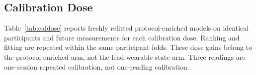 \documentclass[12pt]{article}
\begin{document}
\subsection{Calibration Dose}
\label{sec:caldose}
Table~\ref{tab:caldose} reports freshly refitted protocol-enriched models on identical participants and future measurements for each calibration dose. Ranking and fitting are repeated within the same participant folds. These dose gains belong to the protocol-enriched arm, not the lead wearable-state arm. Three readings are one-session repeated calibration, not one-reading calibration.
\begin{table}[t]
\centering
\caption{Refitted Protocol-Enriched Models by Calibration Dose (653 Participants)}
\label{tab:caldose}
\scriptsize
{}
\end{table}
\end{document}
